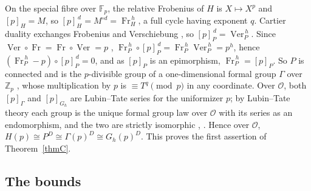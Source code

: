 \documentclass[11pt]{amsart}
\theoremstyle{definition}
\theoremstyle{remark}
\newcommand{\Z}{\mathbb Z}
\newcommand{\F}{\mathbb F}
\DeclareMathOperator{\Fr}{Fr}
\DeclareMathOperator{\Ver}{Ver}
\begin{document}
On the special fibre over $\F_p$, the relative Frobenius of $H$ is $X\mapsto X^p$ and $[p]_H=M$, so $[p]_H^{\,d}=M^{\circ d}=\Fr_H^{\,h}$, a full cycle having exponent $q$. Cartier duality exchanges Frobenius and Verschiebung \cite[Exp.~VII$_A$, 4.3.3]{SGA3}, so $[p]_P^{\,d}=\Ver_P^{\,h}$. Since $\Ver\circ\Fr=\Fr\circ\Ver=p$ \cite[Exp.~VII$_A$, 4.3 and 4.3.2]{SGA3}, $\Fr_P^{\,h}\circ[p]_P^{\,d}=\Fr_P^{\,h}\Ver_P^{\,h}=p^h$, hence $(\Fr_P^{\,h}-p)\circ[p]_P^{\,d}=0$, and as $[p]_P$ is an epimorphism, $\Fr_P^{\,h}=[p]_P$. So $P$ is connected and is the $p$-divisible group of a one-dimensional formal group $\Gamma$ over $\Z_p$ \cite[\S2.2, Proposition 1]{Tate67}, whose multiplication by $p$ is $\equiv T^q\pmod p$ in any coordinate. Over $\mathcal O$, both $[p]_\Gamma$ and $[p]_{G_h}$ are Lubin--Tate series for the uniformizer $p$; by Lubin--Tate theory each group is the unique formal group law over $\mathcal O$ with its series as an endomorphism, and the two are strictly isomorphic \cite[(5.1)]{Hazewinkel79}, \cite{LT65}. Hence over $\mathcal O$, $H(p)\cong P^D\cong\Gamma(p)^D\cong G_h(p)^D$. This proves the first assertion of Theorem~\ref{thmC}.

\subsection{The bounds}
\end{document}

